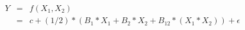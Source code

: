 

\[
\begin{array}{lll}Y & = & f(X_1,X_2) \\ & = & c + (1/2)*(B_1*X_1 + B_2*X_2 + B_{12}*(X_1*X_2)) + \epsilon \end{array}

\]


